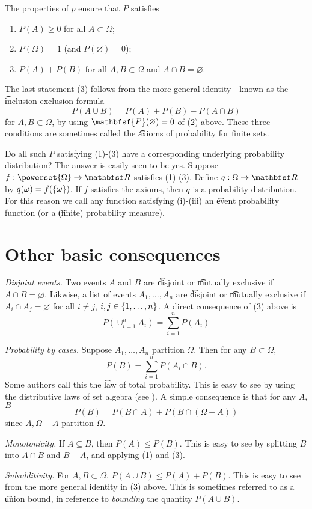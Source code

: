 The properties of $p$ ensure that $P$ satisfies
    \begin{enumerate}
      \item $P(A) \geq 0$ for all $A \subset \Omega $;
      \item $P(\Omega ) = 1$ (and $P(\varnothing) = 0$);
      \item $P(A) + P(B)$ for all $A, B \subset \Omega $ and $A \cap  B = \varnothing$.
    \end{enumerate}
The last statement (3) follows from the more general identity---known as the \t{inclusion-exclusion formula}---
\[
P(A \cup B) = P(A) + P(B) - P(A \cap  B)
\]
for $A, B \subset \Omega $, by using $\mathbfsf{P} (\varnothing) = 0$ of (2) above.
These three conditions are sometimes called the \t{axioms of probability for finite sets}.

Do all such $P$ satisfying (1)-(3) have a corresponding underlying probability distribution?
The answer is easily seen to be yes.
Suppose $f: \powerset{\Omega } \to \R $ satisfies (1)-(3).
Define $q: \Omega  \to \R $ by $q(\omega ) = f(\{\omega \})$.
If $f$ satisfies the axioms, then $q$ is a probability distribution.
For this reason we call any function satisfying (i)-(iii) an \t{event probability function} (or a \t{(finite) probability measure}).

\section*{Other basic consequences}

\textit{Disjoint events.}
Two events $A$ and $B$ are \t{disjoint} or \t{mutually exclusive} if $A \cap  B = \varnothing$.
Likwise, a list of events $A_1, \dots , A_n$ are \t{disjoint} or \t{mutually exclusive} if $A_i \cap  A_j = \varnothing$ for all $i \neq j$, $i,j \in \{1, \dots , n\}$.
A direct consequence of (3) above is
\[
\textstyle
P(\cup_{i =1 }^{n} A_i) = \sum_{i = 1}^{n} P(A_i)
\]

\textit{Probability by cases.}
Suppose $A_1, \dots , A_n$ partition $\Omega $.
Then for any $B \subset \Omega $,
\[
\textstyle
P(B) = \sum_{i = 1}^{n} P(A_i \cap  B).
\]
Some authors call this the \t{law of total probability}.
This is easy to see by using the distributive laws of set algebra (see ).
A simple consequence is that for any $A$, $B$
\[
P(B) = P(B \cap  A) + P(B \cap  (\Omega  - A))
\]
since $A, \Omega  - A$ partition $\Omega $.

\textit{Monotonicity.}
If $A \subseteq B$, then $P(A) \leq P(B)$.
This is easy to see by splitting $B$ into $A \cap  B$ and $B - A$, and applying (1) and (3).

\textit{Subadditivity.}
For $A, B \subset \Omega $, $P(A \cup B) \leq P(A) + P(B)$.
This is easy to see from the more general identity in (3) above.
This is sometimes referred to as a \t{union bound}, in reference to \textit{bounding} the quantity $P(A \cup B)$.
